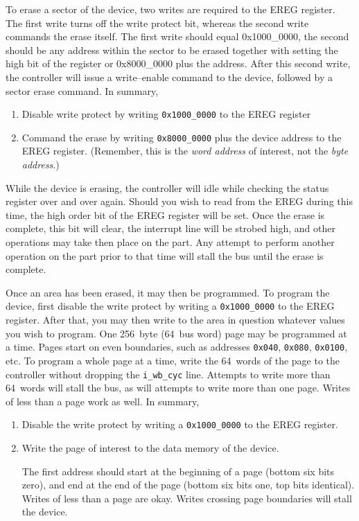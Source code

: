 \documentclass{gqtekspec}
\begin{document}
To erase a sector of the device, two writes are required to the EREG register.
The first write turns off the write protect bit, whereas the second write
commands the erase itself.  The first write should equal \hbox{0x1000\_0000},
the second should be any address within the sector to be erased together
with setting the high bit of the register or \hbox{0x8000\_0000} plus the
address.  After this second write, the controller will issue a write--enable
command to the device, followed by a sector erase command.  In summary,
\begin{enumerate}
\item Disable write protect by writing \hbox{\tt 0x1000\_0000} to the EREG
	register
\item Command the erase by writing \hbox{\tt 0x8000\_0000} plus the device
	address to the EREG register.  (Remember, this is the {\em word
	address} of interest, not the {\em byte address}.)
\end{enumerate}

While the device is erasing, the controller will idle while checking the
status register over and over again.  Should you wish to read from the EREG
during this time, the high order bit of the EREG register will be set. 
Once the erase is complete, this bit will clear, the interrupt line will
be strobed high, and other operations may take then place on the part.  Any
attempt to perform another operation on the part prior to that time will stall
the bus until the erase is complete.

Once an area has been erased, it may then be programmed.  To program the device,
first disable the write protect by writing a {\tt 0x1000\_0000} to the EREG
register.  After that, you may then write to the area in question whatever
values you wish to program.  One 256~byte (64~bus word) page may be programmed
at a time.  Pages start on even boundaries, such as addresses {\tt 0x040},
{\tt 0x080}, {\tt 0x0100}, etc.  To program a whole page at a time, write the
64~words of the page to the controller without dropping the {\tt i\_wb\_cyc}
line.  Attempts to write more than 64~words will stall the bus, as will
attempts to write more than one page.  Writes of less than a page work as well.
In summary,
\begin{enumerate}
\item Disable the write protect by writing a {\tt 0x1000\_0000} to the EREG
	register.
\item Write the page of interest to the data memory of the device. 

	The first address should start at the beginning of a page (bottom six
	bits zero), and end at the end of the page (bottom six bits one, top
	bits identical).  Writes of less than a page are okay.  Writes crossing
	page boundaries will stall the device.
\end{enumerate}
\end{document}
